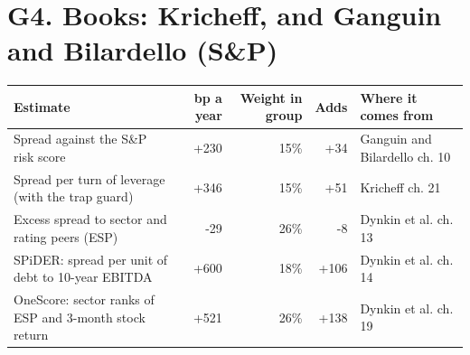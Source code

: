 \documentclass[11pt,a4paper]{article}
\begin{document}
\section*{G4. Books: Kricheff, and Ganguin and Bilardello (S\&P)}
\par\noindent{}
\begin{center}\footnotesize\setlength{\tabcolsep}{3.5pt}\begin{tabular}{@{}p{6.2cm}rrrp{4.2cm}@{}}\toprule
Estimate & bp a year & Weight in group & Adds & Where it comes from \\\midrule
Spread against the S\&P risk score & +230 & 15\% & +34 & Ganguin and Bilardello ch. 10 \\
Spread per turn of leverage (with the trap guard) & +346 & 15\% & +51 & Kricheff ch. 21 \\
Excess spread to sector and rating peers (ESP) & -29 & 26\% & -8 & Dynkin et al. ch. 13 \\
SPiDER: spread per unit of debt to 10-year EBITDA & +600 & 18\% & +106 & Dynkin et al. ch. 14 \\
OneScore: sector ranks of ESP and 3-month stock return & +521 & 26\% & +138 & Dynkin et al. ch. 19 \\
\bottomrule\end{tabular}\end{center}
\end{document}

